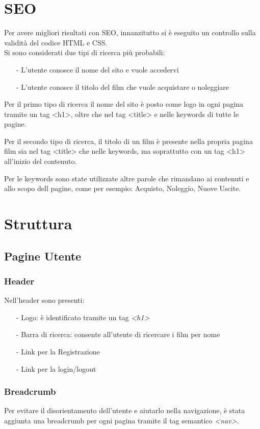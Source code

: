 \documentclass[a4paper]{article}
\begin{document}
\section{SEO}
Per avere migliori risultati con SEO, innanzitutto si è eseguito un controllo sulla validità del codice HTML e CSS.\\
Si sono considerati due tipi di ricerca più probabili:
\begin{itemize}
    \item [-] L'utente conosce il nome del sito e vuole accedervi
    \item [-] L'utente conosce il titolo del film che vuole acquistare o noleggiare
\end{itemize}
Per il primo tipo di ricerca il nome del sito è posto come logo in ogni pagina tramite un tag <h1>, oltre che nel tag <title> e nelle keywords di tutte le pagine.

Per il secondo tipo di ricerca, il titolo di un film è presente nella propria pagina film sia nel tag <title> che nelle keywords, ma soprattutto con un tag <h1> all'inizio del contenuto.

Per le keywords sono state utilizzate altre parole che rimandano ai contenuti e allo scopo dell pagine, come per esempio: Acquisto, Noleggio, Nuove Uscite.

\section{Struttura}

\subsection{Pagine Utente}

\subsubsection{Header}

Nell'header sono presenti:
\begin{itemize}
    \item [-] Logo: è identificato tramite un tag \textit{<h1>}
    \item [-] Barra di ricerca: consente all'utente di ricercare i film per nome
    \item [-] Link per la Registrazione
    \item [-] Link per la login/logout
\end{itemize}

\subsubsection{Breadcrumb}
Per evitare il disorientamento dell'utente e aiutarlo nella navigazione, è stata aggiunta una breadcrumb per ogni pagina tramite il tag semantico \textit{<nav>}.
\end{document}
